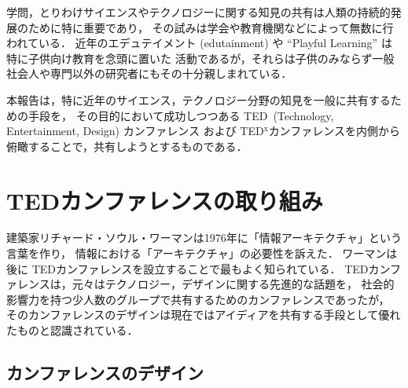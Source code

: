 \documentclass[submit,techreq,jkeyword,noauthor]{ipsj}
\newcommand{\TED}{\textrm{TED}}
\newcommand{\TEDx}{\TED${}^{\textrm{x}}$}
\newcommand{\TEDtitle}{\textbf{TED}}
\begin{document}
学問，とりわけサイエンスやテクノロジーに関する知見の共有は人類の持続的発展のために特に重要であり，
その試みは学会や教育機関などによって無数に行われている．
近年のエデュテイメント (edutainment) や ``Playful Learning'' は特に子供向け教育を念頭に置いた
活動であるが，それらは子供のみならず一般社会人や専門以外の研究者にもその十分親しまれている．\cite{nu}



本報告は，特に近年のサイエンス，テクノロジー分野の知見を一般に共有するための手段を，
その目的において成功しつつある \TED\ (Technology, Entertainment, Design) カンファレンス
および \TEDx カンファレンスを内側から俯瞰することで，共有しようとするものである．


\section{\TEDtitle カンファレンスの取り組み}

建築家リチャード・ソウル・ワーマンは1976年に「情報アーキテクチャ」という言葉を作り，
情報における「アーキテクチャ」の必要性を訴えた．\cite{rsw}
ワーマンは後に \TED カンファレンスを設立することで最もよく知られている．
\TED カンファレンスは，元々はテクノロジー，デザインに関する先進的な話題を，
社会的影響力を持つ少人数のグループで共有するためのカンファレンスであったが，
そのカンファレンスのデザインは現在ではアイディアを共有する手段として優れたものと認識されている．

\subsection{カンファレンスのデザイン}
\end{document}
